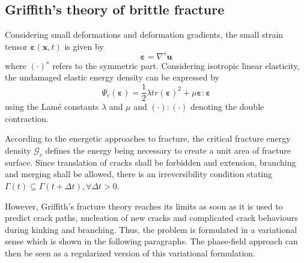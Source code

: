 \subsection{Griffith's theory of brittle fracture} \label{sec:formul_Griffith}
Considering small deformations and deformation gradients, the small strain tensor $\bm{\varepsilon}\left(\mathbf{x},t\right)$ is given by
\begin{equation}
	\bm{\varepsilon} = \nabla^{s}\mathbf{u}
\end{equation}
where $\left(\cdot\right)^{s}$ refers to the symmetric part. Considering isotropic linear elasticity, the undamaged elastic energy density can be expressed by
\begin{equation} \label{eq:psi_e}
	\Psi_ {e}\left(\bm{\varepsilon}\right) = \dfrac{1}{2}\lambda tr\left(\bm{\varepsilon}\right)^{2}+\mu\bm{\varepsilon}:\bm{\varepsilon}
\end{equation}
using the Lam\'{e} constants $\lambda$ and $\mu$ and $\left(\cdot\right):\left(\cdot\right)$ denoting the double contraction.

According to the energetic approaches to fracture, the critical fracture energy density $\mathcal{G}_{c}$ defines the energy being necessary to create a unit area of fracture surface. Since translation of cracks shall be forbidden and extension, branching and merging shall be allowed, there is an irreversibility condition stating $\Gamma\left(t\right)\subseteq\Gamma\left(t+\Delta t\right), \forall \Delta t>0$.

However, Griffith's fracture theory reaches its limits as soon as it is used to predict crack paths, nucleation of new cracks and complicated crack behaviours during kinking and branching. Thus, the problem is formulated in a variational sense which is shown in the following paragraphs. The phase-field approach can then be seen as a regularized version of this variational formulation. \citep{05_PF_ductile}


